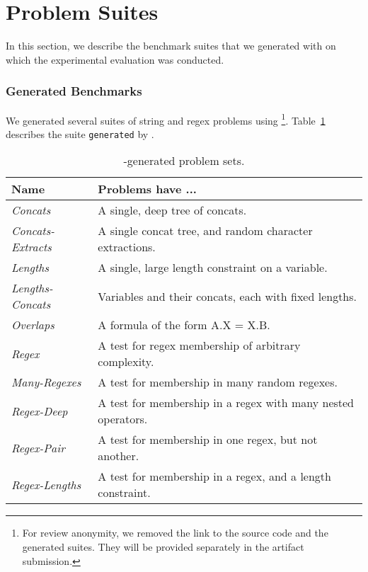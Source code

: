 \section{Problem Suites}
\label{sec:problems}

In this section, we describe the benchmark suites that we generated
with \fuzzer{} on which the experimental evaluation was conducted.

\subsubsection{Generated Benchmarks}

We generated several suites
of string and regex problems using \fuzzer{}\footnote{For review
anonymity, we removed the link to the source code and the generated
suites. They will be provided separately in the artifact
submission.}. Table~\ref{tbl:generated} describes the suite
\texttt{generated} by \generator{}.
\begin{table}[H]
    \centering
    \caption{\generator{}-generated problem sets.}
    \label{tbl:generated}
    \begin{tabular}{|l|l|}
        \hline
        \textbf{Name}             & \textbf{Problems have ...} \\ \hline
        \textit{Concats}          & A single, deep tree of concats. \\ \hline
        \textit{Concats-Extracts} & A single concat tree, and random character extractions. \\ \hline
        \textit{Lengths}          & A single, large length constraint on a variable. \\ \hline
        \textit{Lengths-Concats}  & Variables and their concats, each with fixed lengths. \\ \hline
        \textit{Overlaps}         & A formula of the form A.X = X.B. \\ \hline
        \textit{Regex}            & A test for regex membership of arbitrary complexity. \\ \hline
        \textit{Many-Regexes}     & A test for membership in many random regexes. \\ \hline
        \textit{Regex-Deep}       & A test for membership in a regex with many nested operators. \\ \hline
        \textit{Regex-Pair}       & A test for membership in one regex, but not another. \\ \hline
        \textit{Regex-Lengths}    & A test for membership in a regex, and a length constraint. \\ \hline
    \end{tabular}
\end{table}

